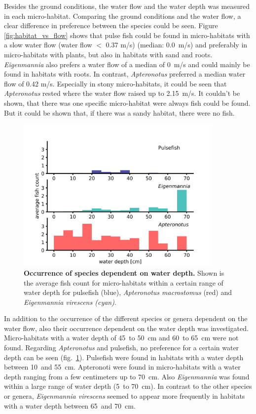 Besides the ground conditions, the water flow and the water depth was measured in each micro-habitat. Comparing the ground conditions and the water flow, a clear difference in preference between the species could be seen. Figure \ref{fig:habitat_vs_flow} shows that pulse fish could be found in micro-habitats with a slow water flow (water flow $<$ 0.37 m/s) (median: 0.0~m/s) and preferably in micro-habitats with plants, but also in habitats with sand and roots. \textit{Eigenmannia} also prefers a water flow of a median of 0~m/s and could mainly be found in habitats with roots. In contrast, \textit{Apteronotus} preferred a median water flow of 0.42 m/s. Especially in stony micro-habitats, it could be seen that \textit{Apteronotus} rested where the water flow raised up to 2.15~m/s. 
It couldn't be shown, that there was one specific micro-habitat were always fish could be found. But it could be shown that, if there was a sandy habitat, there were no fish.

\begin{figure}[H]
    \centering
    \includegraphics[width=0.9\textwidth]{pictures/Results/JULE_flow_depth2.png}
    \caption{\textbf{Occurrence of species dependent on water depth.} Shown is the average fish count for micro-habitats within a certain range of water depth for pulsefish (blue), \textit{Apteronotus macrostomus} (red) and \textit{Eigenmannia virescens (cyan)}.}
    \label{fig:habitat_vs_depth}
\end{figure}

In addition to the occurrence of the different species or genera dependent on the water flow, also their occurrence dependent on the water depth was investigated. Micro-habitats with a water depth of 45~to 50~cm and 60~to 65~cm were not found. Regarding \textit{Apteronotus} and pulsefish, no preference for a certain water depth can be seen (fig.~\ref{fig:habitat_vs_depth}). Pulsefish were found in habitats with a water depth between 10~and 55~cm. Apteronoti were found in micro-habitats with a water depth ranging from a few centimeters up to 70~cm. Also \textit{Eigenmannia} was found within a large range of water depth (5~to 70~cm). In contrast to the other species or genera, \textit{Eigenmannia virescens} seemed to appear more frequently in habitats with a water depth between 65~and 70~cm.


